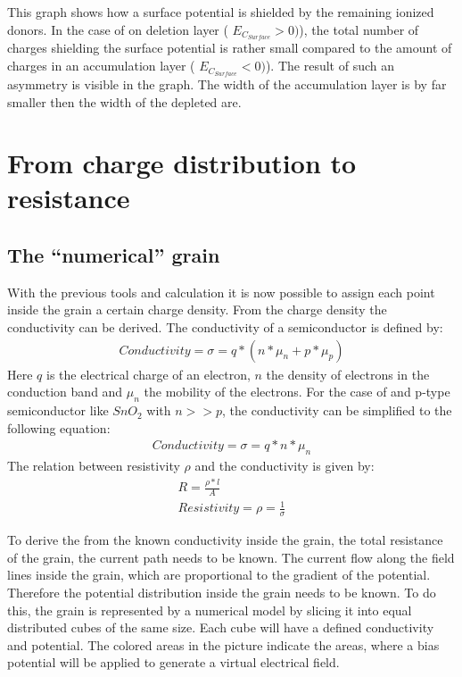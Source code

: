 \documentclass[11pt]{article}
\begin{document}
    This graph shows how a surface potential is shielded by the remaining
ionized donors. In the case of on deletion layer (
\(E_{C_{Surface}}>0 )\)), the total number of charges shielding the
surface potential is rather small compared to the amount of charges in
an accumulation layer ( \(E_{C_{Surface}}<0 )\)). The result of such an
asymmetry is visible in the graph. The width of the accumulation layer
is by far smaller then the width of the depleted are.

    \hypertarget{from-charge-distribution-to-resistance}{%
\section{From charge distribution to
resistance}\label{from-charge-distribution-to-resistance}}

    \hypertarget{the-numerical-grain}{%
\subsection{The ``numerical'' grain}\label{the-numerical-grain}}

    With the previous tools and calculation it is now possible to assign
each point inside the grain a certain charge density. From the charge
density the conductivity can be derived. The conductivity of a
semiconductor is defined by: \begin{align}
 Conductivity  = \sigma = q*\left(n*\mu_n +p*\mu_p\right)
\end{align} Here \(q\) is the electrical charge of an electron, \(n\)
the density of electrons in the conduction band and \(\mu_n\) the
mobility of the electrons. For the case of and p-type semiconductor like
\(SnO_2\) with \(n>>p\), the conductivity can be simplified to the
following equation: \begin{align}
Conductivity  = \sigma = q*n*\mu_n 
\end{align} The relation between resistivity \(\rho\) and the
conductivity is given by: \begin{align}
R = \frac{{\rho}*l}{A}\\
Resistivity  = \rho = \frac{1}{\sigma}
\end{align}

To derive the from the known conductivity inside the grain, the total
resistance of the grain, the current path needs to be known. The current
flow along the field lines inside the grain, which are proportional to
the gradient of the potential. Therefore the potential distribution
inside the grain needs to be known. To do this, the grain is represented
by a numerical model by slicing it into equal distributed cubes of the
same size. Each cube will have a defined conductivity and potential. The
colored areas in the picture indicate the areas, where a bias potential
will be applied to generate a virtual electrical field.
\end{document}
